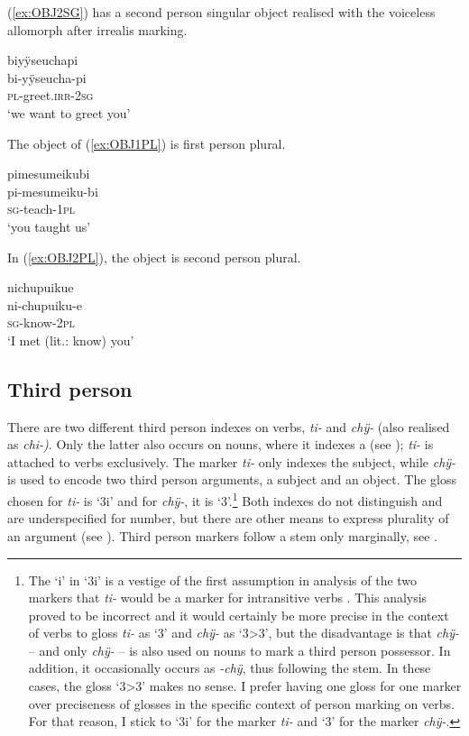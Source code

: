 (\ref{ex:OBJ2SG}) has a second person singular object realised with the voiceless allomorph after irrealis marking.

\ea\label{ex:OBJ2SG}
\begingl 
\glpreamble biyÿseuchapi\\
\gla bi-yÿseucha-pi\\ 
\textsc{pl}-greet.\textsc{irr}-2\textsc{sg}\\ 
\glft ‘we want to greet you’
\trailingcitation{[rxx-e121128s-2.007]}
\xe

The object of (\ref{ex:OBJ1PL}) is first person plural.

\ea\label{ex:OBJ1PL}
\begingl 
\glpreamble pimesumeikubi\\
\gla pi-mesumeiku-bi\\ 
\textsc{sg}-teach-1\textsc{pl}\\ 
\glft ‘you taught us’
\trailingcitation{[oxx-e120414ls-1a.157]}%
\xe

In (\ref{ex:OBJ2PL}), the object is second person plural. 

\ea\label{ex:OBJ2PL}
\begingl 
\glpreamble nichupuikue\\
\gla ni-chupuiku-e\\ 
\textsc{sg}-know-2\textsc{pl}\\ 
\glft ‘I met (lit.: know) you’
\trailingcitation{[cux-c120410ls.011]}
\xe
{}


\subsection{Third person}\label{sec:3Marking}

There are two different third person indexes on verbs, \textit{ti-} and \textit{chÿ-} (also realised as \textit{chi-)}. Only the latter also occurs on nouns, where it indexes a  (see ); \textit{ti-} is attached to verbs exclusively. The marker \textit{ti-} only indexes the subject, while \textit{chÿ-} is used to encode two third person arguments, a subject and an object. The gloss chosen for \textit{ti-} is ‘3i’ and for \textit{chÿ-}, it is ‘3’.\footnote{The ‘i’ in ‘3i’ is a vestige of the first assumption in analysis of the two markers that \textit{ti-} would be a marker for intransitive verbs \citep[cf.][506]{Danielsen2011}. This analysis proved to be incorrect and it would certainly be more precise in the context of verbs to gloss \textit{ti-} as ‘3’ and \textit{chÿ-} as ‘3>3’, but the disadvantage is that \textit{chÿ-} – and only \textit{chÿ-} – is also used on nouns to mark a third person possessor. In addition, it occasionally occurs as \textit{-chÿ}, thus following the stem. In these cases, the gloss ‘3>3’ makes no sense. I prefer having one gloss for one marker over preciseness of glosses in the specific context of person marking on verbs. For that reason, I stick to ‘3i’ for the marker \textit{ti-} and ‘3’ for the marker \textit{chÿ-}.} Both indexes do not distinguish  and are underspecified for number, but there are other means to express plurality of an argument (see ). Third person markers follow a stem only marginally, see .


